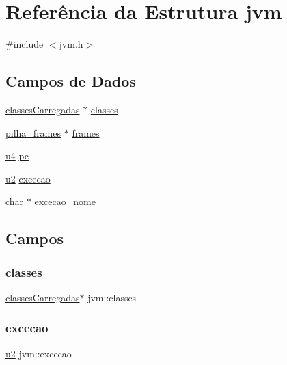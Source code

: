 \hypertarget{structjvm}{}\section{Referência da Estrutura jvm}
\label{structjvm}


{\ttfamily \#include $<$jvm.\+h$>$}

\subsection*{Campos de Dados}
\begin{DoxyCompactItemize}
\item 
\hyperlink{structclassesCarregadas}{classes\+Carregadas} $\ast$ \hyperlink{structjvm_a43783d4b1817816cccc62a08154190f6}{classes}
\item 
\hyperlink{structpilha__frames}{pilha\+\_\+frames} $\ast$ \hyperlink{structjvm_a4277814c8cb94f0e77f09428d3d668b9}{frames}
\item 
\hyperlink{lista__operandos_8h_ae5be1f726785414dd1b77d60df074c9d}{u4} \hyperlink{structjvm_ac879eb42576afb2256646f478a7f68c2}{pc}
\item 
\hyperlink{lista__operandos_8h_a732cde1300aafb73b0ea6c2558a7a54f}{u2} \hyperlink{structjvm_a9a1827338d5d118644ec0a72a76a5d89}{excecao}
\item 
char $\ast$ \hyperlink{structjvm_a471ac752db9424623227c661b194399b}{excecao\+\_\+nome}
\end{DoxyCompactItemize}


\subsection{Campos}
\mbox{\label{structjvm_a43783d4b1817816cccc62a08154190f6}} 
\subsubsection{\texorpdfstring{classes}{classes}}
{\footnotesize\ttfamily \hyperlink{structclassesCarregadas}{classes\+Carregadas}$\ast$ jvm\+::classes}

\mbox{\label{structjvm_a9a1827338d5d118644ec0a72a76a5d89}} 
\subsubsection{\texorpdfstring{excecao}{excecao}}
{\footnotesize\ttfamily \hyperlink{lista__operandos_8h_a732cde1300aafb73b0ea6c2558a7a54f}{u2} jvm\+::excecao}


